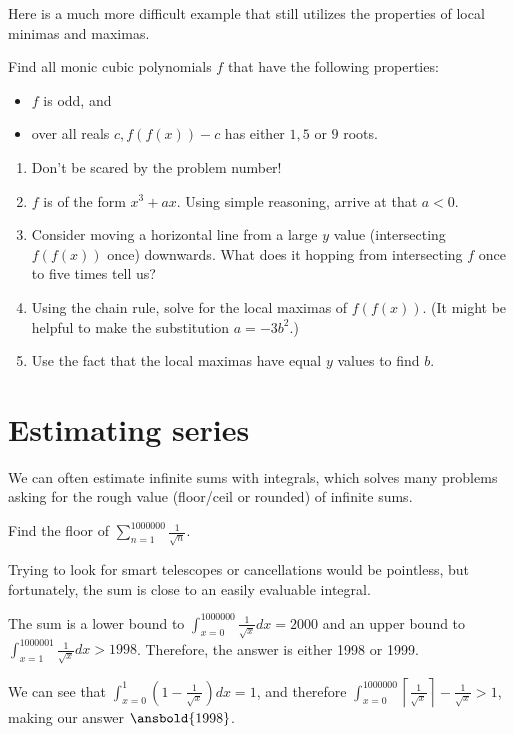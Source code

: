 \documentclass[mast]{lucky}
\begin{document}
Here is a much more difficult example that still utilizes the properties of local minimas and maximas.
\begin{exam}
Find all monic cubic polynomials $f$ that have the following properties:
\begin{itemize}
\item $f$ is odd, and
\item over all reals $c, f(f(x))-c$ has either $1, 5$ or $9$ roots.
\end{itemize}
\end{exam}
\begin{walk}
\begin{enumerate}
\item Don't be scared by the problem number!
\item $f$ is of the form $x^3+ax$. Using simple reasoning, arrive at that $a<0$.
\item Consider moving a horizontal line from a large $y$ value (intersecting $f(f(x))$ once) downwards. What does it hopping from intersecting $f$ once to five times tell us?
\item Using the chain rule, solve for the local maximas of $f(f(x))$. (It might be helpful to make the substitution $a=-3b^2$.)
\item Use the fact that the local maximas have equal $y$ values to find $b$.
\end{enumerate}
\end{walk}
\section{Estimating series}
We can often estimate infinite sums with integrals, which solves many problems asking for the rough value (floor/ceil or rounded) of infinite sums.
\begin{exam}
Find the floor of $\sum_{n=1}^{1000000}\frac{1}{\sqrt{n}}$.
\end{exam}
\begin{sol}
Trying to look for smart telescopes or cancellations would be pointless, but fortunately, the sum is close to an easily evaluable integral.

The sum is a lower bound to $\int_{x=0}^{1000000}\frac{1}{\sqrt{x}}dx=2000$ and an upper bound to $\int_{x=1}^{1000001}\frac{1}{\sqrt{x}}dx>1998$. Therefore, the answer is either 1998 or 1999. 

We can see that $\int_{x=0}^{1}(1-\frac{1}{\sqrt{x}})dx=1$, and therefore $\int_{x=0}^{1000000}\left\lceil\frac{1}{\sqrt{x}}\right\rceil-\frac{1}{\sqrt{x}}>1$, making our answer $\ansbold{1998}$.
\end{sol}
\end{document}
